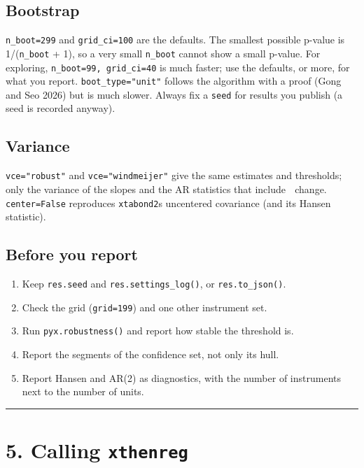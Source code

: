 \documentclass[
  10.5pt,
  a4paper,
]{article}
\providecommand{\tightlist}{%
  \setlength{\itemsep}{0pt}\setlength{\parskip}{0pt}}
\begin{document}
\subsection{Bootstrap}\label{bootstrap}

\texttt{n\_boot=299} and \texttt{grid\_ci=100} are the defaults. The
smallest possible p-value is 1/(\texttt{n\_boot} + 1), so a very small
\texttt{n\_boot} cannot show a small p-value. For exploring,
\texttt{n\_boot=99,\ grid\_ci=40} is much faster; use the defaults, or
more, for what you report. \texttt{boot\_type="unit"} follows the
algorithm with a proof (Gong and Seo 2026) but is much slower. Always
fix a \texttt{seed} for results you publish (a seed is recorded anyway).

\subsection{Variance}\label{variance}

\texttt{vce="robust"} and \texttt{vce="windmeijer"} give the same
estimates and thresholds; only the variance of the slopes and the AR
statistics that include  change. \texttt{center=False} reproduces
\texttt{xtabond2}\textquotesingle s uncentered covariance (and its
Hansen statistic).

\subsection{Before you report}\label{before-you-report}

\begin{enumerate}
\def\labelenumi{\arabic{enumi}.}
\tightlist
\item
  Keep \texttt{res.seed} and \texttt{res.settings\_log()}, or
  \texttt{res.to\_json()}.
\item
  Check the grid (\texttt{grid=199}) and one other instrument set.
\item
  Run \texttt{pyx.robustness()} and report how stable the threshold is.
\item
  Report the segments of the confidence set, not only its hull.
\item
  Report Hansen and AR(2) as diagnostics, with the number of instruments
  next to the number of units.
\end{enumerate}

\begin{center}\rule{0.5\linewidth}{0.5pt}\end{center}

\section{\texorpdfstring{5. Calling
\texttt{xthenreg}}{5. Calling xthenreg}}\label{calling-xthenreg}
\end{document}

